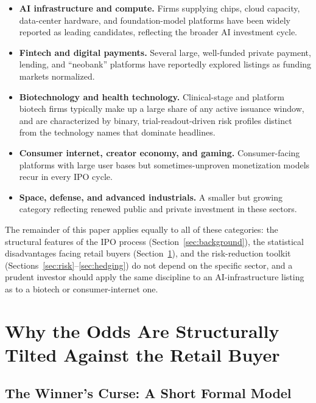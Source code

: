 \documentclass[conference]{IEEEtran}
\begin{document}
\begin{itemize}
    \item \textbf{AI infrastructure and compute.} Firms supplying chips, cloud capacity, data-center hardware, and foundation-model platforms have been widely reported as leading candidates, reflecting the broader AI investment cycle.
    \item \textbf{Fintech and digital payments.} Several large, well-funded private payment, lending, and ``neobank'' platforms have reportedly explored listings as funding markets normalized.
    \item \textbf{Biotechnology and health technology.} Clinical-stage and platform biotech firms typically make up a large share of any active issuance window, and are characterized by binary, trial-readout-driven risk profiles distinct from the technology names that dominate headlines.
    \item \textbf{Consumer internet, creator economy, and gaming.} Consumer-facing platforms with large user bases but sometimes-unproven monetization models recur in every IPO cycle.
    \item \textbf{Space, defense, and advanced industrials.} A smaller but growing category reflecting renewed public and private investment in these sectors.
\end{itemize}

The remainder of this paper applies equally to all of these categories: the structural features of the IPO process (Section~\ref{sec:background}), the statistical disadvantages facing retail buyers (Section~\ref{sec:disadvantage}), and the risk-reduction toolkit (Sections~\ref{sec:risk}--\ref{sec:hedging}) do not depend on the specific sector, and a prudent investor should apply the same discipline to an AI-infrastructure listing as to a biotech or consumer-internet one.

\section{Why the Odds Are Structurally Tilted Against the Retail Buyer}
\label{sec:disadvantage}

\subsection{The Winner's Curse: A Short Formal Model}
\end{document}
